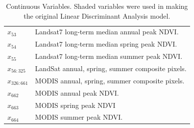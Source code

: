 \def\year{2017}\relax \documentclass[letterpaper]{article}
\begin{document}
\begin{table}
\begin{tabularx}{\linewidth}{@{ }l X@{ }}
$x_{53}$&Landsat7 long-term median annual peak NDVI.\\
$x_{54}$&Landsat7 long-term median spring peak NDVI.\\
$x_{55}$&Landsat7 long-term median summer peak NDVI.\\
$x_{56:325}$ &  LandSat annual, spring, summer composite pixels.\\
$x_{326:661}$ & MODIS annual, spring, summer composite pixels.\\
$x_{662}$ &  MODIS annual peak NDVI.\\
$x_{663}$ & MODIS spring peak NDVI\\
$x_{664}$ & MODIS summer peak NDVI.\\
\bottomrule[.2em]
\end{tabularx}
\caption{Continuous Variables. Shaded variables were used in making the original Linear Discriminant Analysis model.} \label{tab:data}
\end{table}
\end{document}
